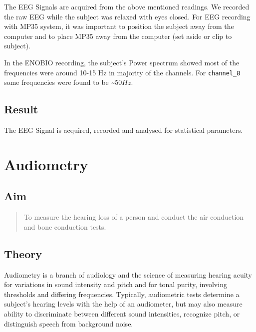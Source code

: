 \documentclass[
  11pt,
  letterpaper,
  DIV=11,
  numbers=noendperiod]{scrreprt}
\begin{document}
The EEG Signals are acquired from the above mentioned readings. We
recorded the raw EEG while the subject was relaxed with eyes closed. For
EEG recording with MP35 system, it was important to position the subject
away from the computer and to place MP35 away from the computer (set
aside or clip to subject).

In the ENOBIO recording, the subject's Power spectrum showed most of the
frequencies were around 10-15 Hz in majority of the channels. For
\texttt{channel\_8} some frequencies were found to be
\textasciitilde{}\(50Hz\).

\section{Result}\label{result-3}

The EEG Signal is acquired, recorded and analysed for statistical
parameters.


\chapter{Audiometry}\label{audiometry}

\section{Aim}\label{aim-4}

\begin{quote}
To measure the hearing loss of a person and conduct the air conduction
and bone conduction tests.
\end{quote}

\section{Theory}\label{theory-4}

Audiometry is a branch of audiology and the science of measuring hearing
acuity for variations in sound intensity and pitch and for tonal purity,
involving thresholds and differing frequencies. Typically, audiometric
tests determine a subject's hearing levels with the help of an
audiometer, but may also measure ability to discriminate between
different sound intensities, recognize pitch, or distinguish speech from
background noise.
\end{document}
